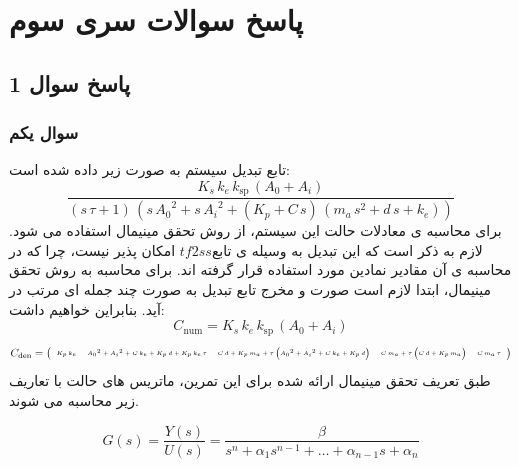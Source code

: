 
\chapter{پاسخ سوالات سری سوم}

\section*{ پاسخ سوال 1}
\subsection*{سوال یکم}

تابع تبدیل سیستم به صورت زیر داده شده است:
\[
\frac{K_s \,k_e \,k_{\textrm{sp}} \,{\left(A_0 +A_i \right)}}{{\left(s\,\tau +1\right)}\,{\left(s\,{A_0 }^2 +s\,{A_i }^2 +{\left(K_p +C\,s\right)}\,{\left(m_a \,s^2 +d\,s+k_e \right)}\right)}}
\]
برای محاسبه ی معادلات حالت این سیستم، از روش تحقق مینیمال استفاده می شود. لازم به ذکر است که این تبدیل به وسیله ی تابع$ tf2ss$ امکان پذیر نیست، چرا که در محاسبه ی آن مقادیر نمادین مورد استفاده قرار گرفته اند. 
برای محاسبه به روش تحقق مینیمال، ابتدا لازم است صورت و مخرج تابع تبدیل به صورت چند جمله ای مرتب در آید.
بنابراین خواهیم داشت:
\[
C_{\textrm{num}} = K_s \,k_e \,k_{\textrm{sp}} \,{\left(A_0 + A_i \right)}
\]
\[
\tiny
C_{\textrm{den}} = \left(\begin{array}{ccccc} 
	K_p \,k_e  & {A_0 }^2 + {A_i }^2 + C \,k_e + K_p \,d + K_p \,k_e \,\tau & C \,d + K_p \,m_a + \tau \,{\left({A_0 }^2 + {A_i }^2 + C \,k_e + K_p \,d \right)} & C \,m_a + \tau \,{\left(C \,d + K_p \,m_a \right)} & C \,m_a \,\tau 
\end{array}\right)
\]
طبق تعریف تحقق مینیمال ارائه شده برای این تمرین، ماتریس های حالت با تعاریف زیر محاسبه می شوند.

\[
G(s) = \frac{Y(s)}{U(s)} = \frac{\beta}{s^n + \alpha_1 s^{n-1} + \dots + \alpha_{n-1}s + \alpha_n}
\]

